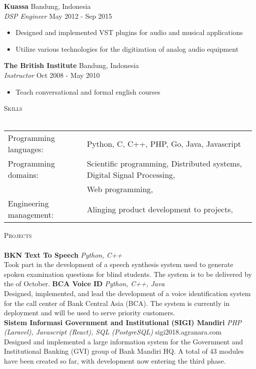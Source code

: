 \documentclass[a4paper]{article}
\newcommand{\lineunder} {
    \vspace*{-8pt} \\
    \hspace*{-18pt} \hrulefill \\
}
\newcommand{\header} [1] {
    {\hspace*{-18pt}\vspace*{6pt} \textsc{#1}}
    \vspace*{-6pt} \lineunder
}
\begin{document}
\textbf{Kuassa} \hfill Bandung, Indonesia\\
\textit{DSP Engineer} \hfill May 2012 - Sep 2015\\
\vspace{-1mm}
\begin{itemize} \itemsep 1pt
	\item Designed and implemented VST plugins for audio and musical applications
  \item Utilize various technologies for the digitization of analog audio
    equipment
\end{itemize}
\textbf{The British Institute} \hfill Bandung, Indonesia\\
\textit{Instructor} \hfill Oct 2008 - May 2010\\
\vspace{-1mm}
\begin{itemize} \itemsep 1pt
	\item Teach conversational and formal english courses
\end{itemize}

\header{Skills}
\begin{tabular}{ l l }
	Programming languages: & Python, C, C++, PHP, Go, Java, Javascript \\
	Programming domains:   & Scientific programming, Distributed systems, 
  Digital Signal Processing, \\
                         & Web programming,        \\
  Engineering management:& Alinging product development to projects, 
\end{tabular}
\vspace{2mm}

\header{Projects}
{\textbf{BKN Text To Speech}} {\sl Python, C++} \\
Took part in the development of a speech synthesis system used to generate
spoken examination questions for blind students. The system is to be delivered
by the of October.
\vspace*{2mm}
{\textbf{BCA Voice ID}} {\sl Python, C++, Java} \\
Designed, implemented, and lead the development of a voice identification
system for the call center of Bank Central Asia (BCA). The system is currently
in deployment and will be used to serve priority customers.\\
\vspace*{2mm}
{\textbf{Sistem Informasi Government and Institutional (SIGI) Mandiri}} {\sl PHP (Laravel), Javascript (React), SQL (PostgreSQL)} \hfill sigi2018.agranara.com\\
Designed and implemented a large information system for the Government and
Institutional Banking (GVI) group of Bank Mandiri HQ. A total of 43 modules
have been created so far, with development now entering the third phase.\\
\vspace*{2mm}
\end{document}
